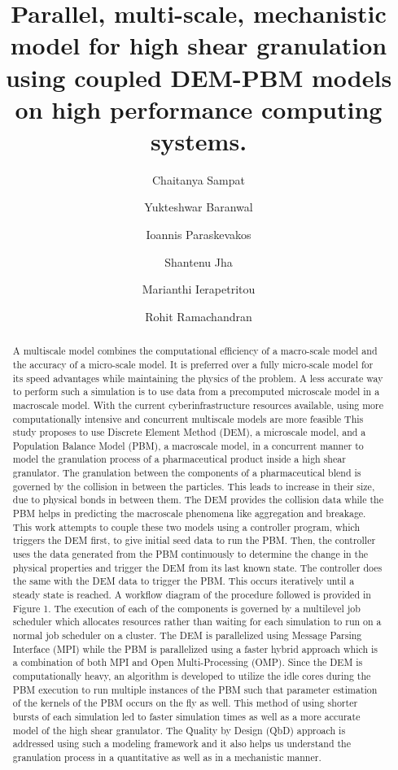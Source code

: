 \documentclass[fleqn,twoside,10pt]{article}
\title{Parallel, multi-scale, mechanistic model for high shear granulation using
coupled DEM-PBM models on high performance computing systems.}
\author[a]{Chaitanya Sampat}
\author[a]{Yukteshwar Baranwal}
\author[b]{Ioannis Paraskevakos}
\author[b]{Shantenu Jha}
\author[a]{Marianthi Ierapetritou}
\author[a,*]{Rohit Ramachandran}
\affil[a]{Department of Chemical and Biochemical Engineering, Rutgers University, Piscataway, NJ-08901, USA}
\affil[b]{Electric and Computer Engineering, Rutgers University, Piscataway, NJ-08901, USA}
\begin{document}
\maketitle             %
\thispagestyle{empty}  %


\begin{abstract}
A multiscale model combines the computational efficiency of a macro-scale model and the
accuracy of a micro-scale model. It is preferred over a fully micro-scale model for its speed advantages while maintaining the physics 
of the problem. A less accurate way to perform such a simulation is to use data 
from a precomputed microscale model in a macroscale 
model. With the current cyberinfrastructure resources available, using more computationally intensive and concurrent multiscale models 
are more feasible This study proposes to use Discrete Element Method (DEM), a 
microscale model, and a Population Balance Model (PBM), 
a macroscale model, in a concurrent manner to model the granulation process of a pharmaceutical product inside a high shear 
granulator. The granulation between the components of a pharmaceutical blend is governed by the collision in between the particles. 
This leads to increase in their size, due to physical bonds in between them. The DEM provides the collision data while the PBM helps 
in predicting the macroscale phenomena like aggregation and breakage. This work attempts to couple these two models using a controller 
program, which triggers the DEM first, to give initial seed data to run the PBM. Then, the controller uses the data generated from the 
PBM continuously to determine the change in the physical properties and trigger the DEM from its last known state. The controller does 
the same with the DEM data to trigger the PBM. This occurs iteratively until a steady state is reached. A workflow diagram of the 
procedure followed is provided in Figure 1. The execution of each of the components is governed by a multilevel job scheduler which 
allocates resources rather than waiting for each simulation to run on a
normal job scheduler on a cluster. The DEM is parallelized using Message Parsing Interface (MPI) while the PBM is parallelized using a 
faster hybrid approach which is a combination of both MPI and Open Multi-Processing (OMP). Since the DEM is computationally heavy, an 
algorithm is developed to utilize the idle cores during the PBM execution to run multiple instances of the PBM such that parameter 
estimation of the kernels of the PBM occurs on the fly as well. This method of using shorter bursts of each simulation led to faster 
simulation times as well as a more accurate model of the high shear granulator. The Quality by Design (QbD) approach is addressed 
using such a modeling framework and it also helps us understand the
granulation process in a quantitative as well as in a mechanistic manner.
\end{abstract}
\end{document}
